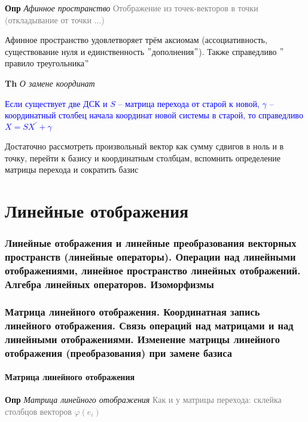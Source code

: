 \documentclass[a4paper, 14pt]{article}
\begin{document}
    \textbf{Опр} \textit{Афинное пространство} \textcolor{gray}{Отображение из точек-векторов в точки (откладывание
    от точки ...)}

    Афинное пространство удовлетворяет трём аксиомам (ассоциативность, существование нуля и единственность \("\)дополнения\("\)).
    Также справедливо \("\)правило треугольника\("\)

    \textbf{Th} \textit{О замене координат}

    \textcolor{blue}{Если существует две ДСК и $S$ -- матрица перехода от старой к новой, $\gamma$
        -- координатный столбец начала координат новой системы в старой, то справедливо $X = SX^{'} + \gamma$}

    Достаточно рассмотреть произвольный вектор как сумму сдвигов в ноль и в точку, перейти к базису и координатным
    столбцам, вспомнить определение матрицы перехода и сократить базис

     \part*{Линейные отображения}

    \section{Линейные отображения и линейные преобразования векторных пространств (линейные операторы).
    Операции над линейными отображениями, линейное пространство линейных отображений.
    Алгебра линейных операторов.
    Изоморфизмы}

    

    \section{Матрица линейного отображения.
    Координатная запись линейного отображения.
    Связь операций над матрицами и над линейными отображениями.
    Изменение матрицы линейного отображения (преобразования) при замене базиса}

    \subsection{Матрица линейного отображения}

    \textbf{Опр} \textit{Матрица линейного отображения} \textcolor{gray}{Как и у матрицы перехода: склейка столбцов
    векторов $\varphi(e_i)$}
\end{document}
